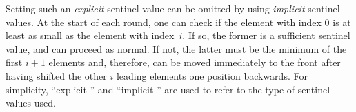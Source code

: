 Setting such an \emph{explicit} sentinel value can be omitted by using \emph{implicit} sentinel values.
At the start of each round, one can check if the element with index \(0\) is at least as small as the element with index~\(i\).
If so, the former is a sufficient sentinel value, and \IS{} can proceed as normal.
If not, the latter must be the minimum of the first \(i + 1\) elements and, therefore, can be moved immediately to the front after having shifted the other \(i\) leading elements one position backwards.
For simplicity, \enquote{explicit \IS{}} and \enquote{implicit \IS{}} are used to refer to the type of sentinel values used.




